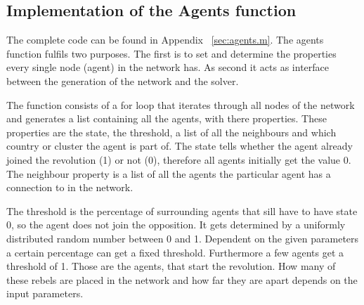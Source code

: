 
\subsection{Implementation of the Agents function}
\label{sec:ImplementAgents }

The complete \matlab code can be found in Appendix ~\ref{sec:agents.m}. The
agents function fulfils two purposes. The first is to set and determine the
properties every single node (agent) in the network has. As second it acts as
interface between the generation of the network and the solver.

The function consists of a for loop that iterates through all nodes of the
network and generates a list containing all the agents, with there
properties. These properties are the state, the threshold, a list of all the
neighbours and which country or cluster the agent is part of. The state tells
whether the agent already joined the revolution (1) or not (0), therefore all
agents initially get the value 0. The neighbour property is a list of all the
agents the particular agent has a connection to in the network.

The threshold is the percentage of surrounding agents that sill have to have
state 0, so the agent does not join the opposition. It gets determined by a
uniformly distributed random number between 0 and 1. Dependent on the given
parameters a certain percentage can get a fixed threshold. Furthermore a few
agents get a threshold of 1. Those are the agents, that start the
revolution. How many of these rebels are placed in the network and how far
they are apart depends on the input parameters.